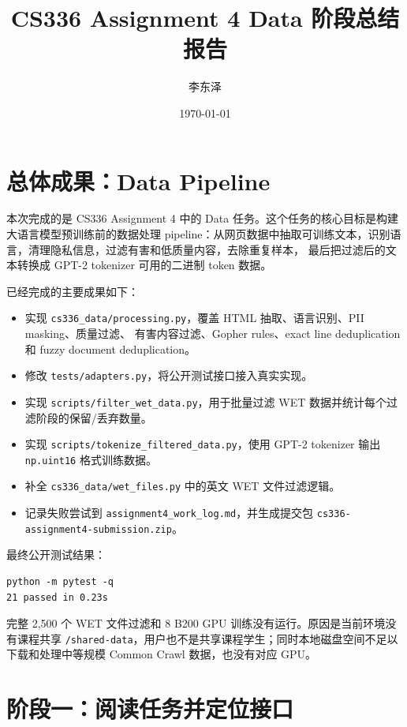 \documentclass[UTF8,11pt]{ctexart}
\title{CS336 Assignment 4 Data 阶段总结报告}
\author{李东泽}
\date{\today}
\begin{document}
\maketitle

\section{总体成果：Data Pipeline}

本次完成的是 CS336 Assignment 4 中的 Data 任务。这个任务的核心目标是构建大语言模型预训练前的数据处理
pipeline：从网页数据中抽取可训练文本，识别语言，清理隐私信息，过滤有害和低质量内容，去除重复样本，
最后把过滤后的文本转换成 GPT-2 tokenizer 可用的二进制 token 数据。

已经完成的主要成果如下：

\begin{itemize}
  \item 实现 \texttt{cs336\_data/processing.py}，覆盖 HTML 抽取、语言识别、PII masking、质量过滤、
  有害内容过滤、Gopher rules、exact line deduplication 和 fuzzy document deduplication。
  \item 修改 \texttt{tests/adapters.py}，将公开测试接口接入真实实现。
  \item 实现 \texttt{scripts/filter\_wet\_data.py}，用于批量过滤 WET 数据并统计每个过滤阶段的保留/丢弃数量。
  \item 实现 \texttt{scripts/tokenize\_filtered\_data.py}，使用 GPT-2 tokenizer 输出 \texttt{np.uint16} 格式训练数据。
  \item 补全 \texttt{cs336\_data/wet\_files.py} 中的英文 WET 文件过滤逻辑。
  \item 记录失败尝试到 \texttt{assignment4\_work\_log.md}，并生成提交包
  \texttt{cs336-assignment4-submission.zip}。
\end{itemize}

最终公开测试结果：

\begin{lstlisting}
python -m pytest -q
21 passed in 0.23s
\end{lstlisting}

完整 2,500 个 WET 文件过滤和 8 B200 GPU 训练没有运行。原因是当前环境没有课程共享
\texttt{/shared-data}，用户也不是共享课程学生；同时本地磁盘空间不足以下载和处理中等规模 Common Crawl
数据，也没有对应 GPU。

\section{阶段一：阅读任务并定位接口}
\end{document}
